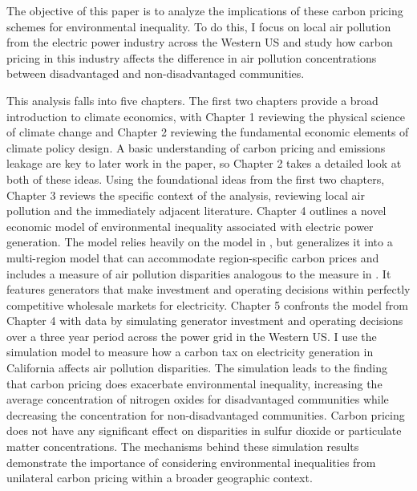 The objective of this paper is to analyze the implications of these carbon pricing schemes for environmental inequality. To do this, I focus on local air pollution from the electric power industry across the Western US and study how carbon pricing in this industry affects the difference in air pollution concentrations between disadvantaged and non-disadvantaged communities. 

This analysis falls into five chapters. The first two chapters provide a broad introduction to climate economics, with Chapter 1 reviewing the physical science of climate change and Chapter 2 reviewing the fundamental economic elements of climate policy design. A basic understanding of carbon pricing and emissions leakage are key to later work in the paper, so Chapter 2 takes a detailed look at both of these ideas. Using the foundational ideas from the first two chapters, Chapter 3 reviews the specific context of the analysis, reviewing local air pollution and the immediately adjacent literature. Chapter 4 outlines a novel economic model of environmental inequality associated with electric power generation. The model relies heavily on the model in \cite{weber2021dynamic}, but generalizes it into a multi-region model that can accommodate region-specific carbon prices and includes a measure of air pollution disparities analogous to the measure in \cite{hernandez2023environmental}. It features generators that make investment and operating decisions within perfectly competitive wholesale markets for electricity. Chapter 5 confronts the model from Chapter 4 with data by simulating generator investment and operating decisions over a three year period across the power grid in the Western US. I use the simulation model to measure how a carbon tax on electricity generation in California affects air pollution disparities. The simulation leads to the finding that carbon pricing does exacerbate environmental inequality, increasing the average concentration of nitrogen oxides for disadvantaged communities while decreasing the concentration for non-disadvantaged communities. Carbon pricing does not have any significant effect on disparities in sulfur dioxide or particulate matter concentrations. The mechanisms behind these simulation results demonstrate the importance of considering environmental inequalities from unilateral carbon pricing within a broader geographic context.

